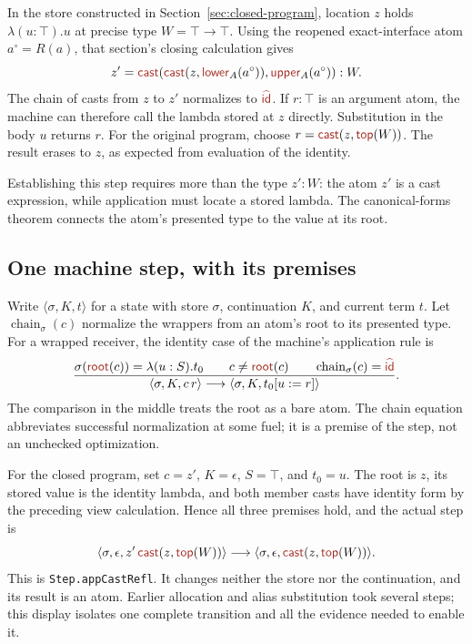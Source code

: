 
\label{sec:application}

In the store constructed in Section~\ref{sec:closed-program}, location
$z$ holds $\lambda(u:\top).u$ at precise type $W=\top\to\top$.
Using the reopened exact-interface atom $a^\circ=R(a)$, that section's
closing calculation gives
\[
 z'=\cast{\cast{z}{\ev{lower}_A(a^\circ)}}{\ev{upper}_A(a^\circ)}:W.
\]
The chain of casts from $z$ to $z'$ normalizes to $\form{id}$.
If $r:\top$ is an argument atom, the machine can therefore call the
lambda stored at $z$ directly. Substitution in the body $u$ returns $r$.
For the original program, choose
$r=\cast{z}{\ev{top}(W)}$.
The result erases to $z$, as expected from evaluation of the identity.

Establishing this step requires more than the type $z':W$: the atom
$z'$ is a cast expression, while application must locate a stored lambda.
The canonical-forms theorem connects the atom's presented type to the
value at its root.

\subsection*{One machine step, with its premises}
Write $\langle\sigma,K,t\rangle$ for a state with store $\sigma$,
continuation $K$, and current term $t$. Let
$\operatorname{chain}_\sigma(c)$ normalize the wrappers from an atom's
root to its presented type. For a wrapped receiver, the identity case
of the machine's application rule is
\[
 \frac{\sigma(\ev{root}(c))=\lambda(u:S).t_0
       \qquad c\ne\ev{root}(c)
       \qquad \operatorname{chain}_\sigma(c)=\form{id}}
      {\langle\sigma,K,c\,r\rangle
         \longrightarrow\langle\sigma,K,t_0[u:=r]\rangle}.
\]
The comparison in the middle treats the root as a bare atom.
The chain equation abbreviates successful normalization at some fuel;
it is a premise of the step, not an unchecked optimization.

For the closed program, set $c=z'$, $K=\epsilon$, $S=\top$, and
$t_0=u$. The root is $z$, its stored value is the identity lambda,
and both member casts have identity form by the preceding view
calculation. Hence all three premises hold, and the actual step is
\[
 \langle\sigma,\epsilon,z'\,\cast{z}{\ev{top}(W)}\rangle
 \longrightarrow
 \langle\sigma,\epsilon,\cast{z}{\ev{top}(W)}\rangle.
\]
This is \texttt{Step.appCastRefl}. It changes neither the store nor the
continuation, and its result is an atom. Earlier allocation and alias
substitution took several steps; this display isolates one complete
transition and all the evidence needed to enable it.

